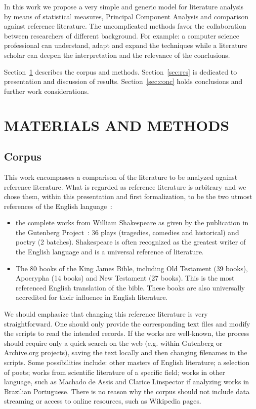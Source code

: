 \documentclass[12pt,fleqn]{article}
\begin{document}
In this work we propose a very simple and generic model for literature analysis
by means of statistical measures, Principal Component Analysis and comparison against
reference literature.
The uncomplicated methods favor the collaboration between researchers of different background.
For example: a computer science professional can understand, adapt and expand the techniques
while a literature scholar can deepen the interpretation and the relevance of the conclusions.

Section~\ref{sec:matMet} describes the corpus and methods.
Section~\ref{sec:res} is dedicated to presentation and discussion of results.
Section~\ref{sec:conc} holds conclusions and further work considerations.

\section{MATERIALS AND METHODS}\label{sec:matMet}
\subsection{Corpus}
This work encompasses a comparison of the literature to be analyzed against
reference literature.
What is regarded as reference literature is arbitrary and we chose them,
within this presentation and first formalization, to be the two utmost references
of the English language~\citep{bib,shake}:
\begin{itemize}
    \item the complete works from William Shakespeare as given by the
        publication in the Gutenberg Project~\citep{shakWhole}:
        36 plays (tragedies, comedies and historical) and poetry (2 batches).
        Shakespeare is often recognized as the greatest writer of the English language
        and is a universal reference of literature.
    \item The 80 books of the King James Bible, including Old Testament (39 books),
        Apocrypha (14 books) and New Testament (27 books).
        This is the most referenced English translation of the bible.
        These books are also universally accredited for their influence in English literature.
\end{itemize}

We should emphasize that changing this reference literature is very straightforward.
One should only provide the corresponding text files and modify the scripts to read the
intended records.
If the works are well-known, the process should require only a quick search on the web
(e.g. within Gutenberg or Archive.org projects), saving the text locally and then changing
filenames in the scripts.
Some possibilities include: other masters of English literature;
a selection of poets; works from scientific literature of a specific field;
works in other language, such as Machado de Assis and Clarice Linspector
if analyzing works in Brazilian Portuguese.
There is no reason why the corpus should not include data streaming or access to online resources,
such as Wikipedia pages.
\end{document}
